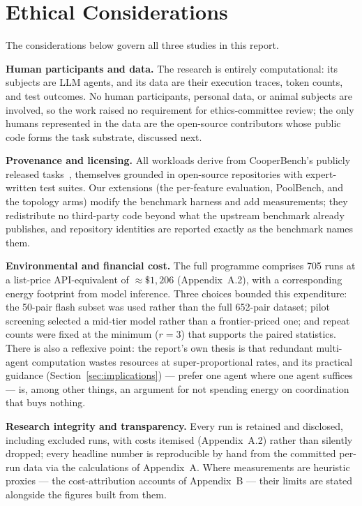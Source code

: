 \documentclass[11pt,a4paper]{article}
\begin{document}
%
%
\section{Ethical Considerations}\label{sec:ethics}

The considerations below govern all three studies in this report.

\textbf{Human participants and data.} The research is entirely computational: its subjects are LLM agents, and its data are their execution traces, token counts, and test outcomes. No human participants, personal data, or animal subjects are involved, so the work raised no requirement for ethics-committee review; the only humans represented in the data are the open-source contributors whose public code forms the task substrate, discussed next.

\textbf{Provenance and licensing.} All workloads derive from CooperBench's publicly released tasks~\cite{khatua2026cooperbench}, themselves grounded in open-source repositories with expert-written test suites. Our extensions (the per-feature evaluation, PoolBench, and the topology arms) modify the benchmark harness and add measurements; they redistribute no third-party code beyond what the upstream benchmark already publishes, and repository identities are reported exactly as the benchmark names them.

\textbf{Environmental and financial cost.} The full programme comprises 705 runs at a list-price API-equivalent of ${\approx}\$1{,}206$ (Appendix~A.2), with a corresponding energy footprint from model inference. Three choices bounded this expenditure: the 50-pair flash subset was used rather than the full 652-pair dataset; pilot screening selected a mid-tier model rather than a frontier-priced one; and repeat counts were fixed at the minimum ($r = 3$) that supports the paired statistics. There is also a reflexive point: the report's own thesis is that redundant multi-agent computation wastes resources at super-proportional rates, and its practical guidance (Section~\ref{sec:implications}) --- prefer one agent where one agent suffices --- is, among other things, an argument for not spending energy on coordination that buys nothing.

\textbf{Research integrity and transparency.} Every run is retained and disclosed, including excluded runs, with costs itemised (Appendix~A.2) rather than silently dropped; every headline number is reproducible by hand from the committed per-run data via the calculations of Appendix~A. Where measurements are heuristic proxies --- the cost-attribution accounts of Appendix~B --- their limits are stated alongside the figures built from them.
\end{document}
